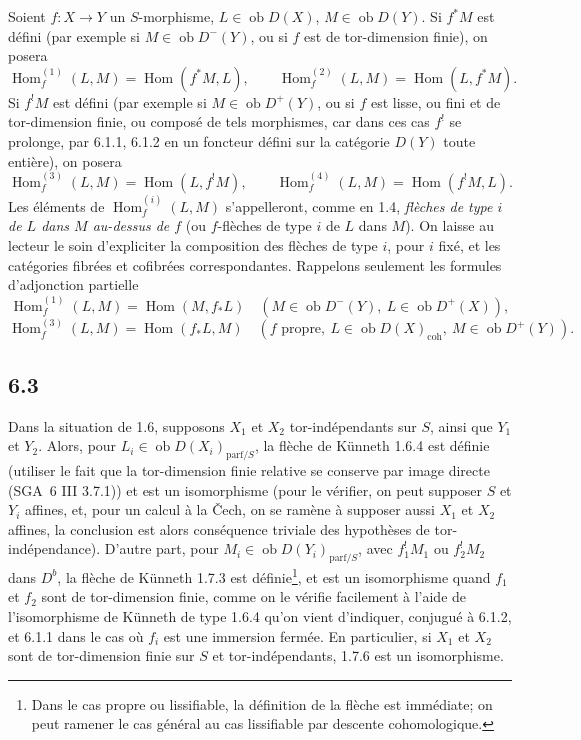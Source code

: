 \documentclass[11pt]{article}
\DeclareMathOperator{\Hom}{Hom}
\providecommand{\Hom}{\operatorname{Hom}}
\begin{document}
Soient $f:X\to Y$ un $S$-morphisme, $L\in\operatorname{ob}D(X)$, $M\in\operatorname{ob}D(Y)$. Si $f^*M$ est défini (par exemple si $M\in\operatorname{ob}D^-(Y)$, ou si $f$ est de tor-dimension finie), on posera
\[
\Hom_f^{(1)}(L,M)=\Hom(f^*M,L),\qquad
\Hom_f^{(2)}(L,M)=\Hom(L,f^*M).
\]
Si $f^!M$ est défini (par exemple si $M\in\operatorname{ob}D^+(Y)$, ou si $f$ est lisse, ou fini et de tor-dimension finie, ou composé de tels morphismes, car dans ces cas $f^!$ se prolonge, par 6.1.1, 6.1.2 en un foncteur défini sur la catégorie $D(Y)$ toute entière), on posera
\[
\Hom_f^{(3)}(L,M)=\Hom(L,f^!M),\qquad
\Hom_f^{(4)}(L,M)=\Hom(f^!M,L).
\]
Les éléments de $\Hom_f^{(i)}(L,M)$ s'appelleront, comme en 1.4, \emph{flèches de type $i$ de $L$ dans $M$ au-dessus de $f$} (ou $f$-flèches de type $i$ de $L$ dans $M$). On laisse au lecteur le soin d'expliciter la composition des flèches de type $i$, pour $i$ fixé, et les catégories fibrées et cofibrées correspondantes. Rappelons seulement les formules d'adjonction partielle
\[
\Hom_f^{(1)}(L,M)=\Hom(M,f_*L)\quad(M\in\operatorname{ob}D^{-}(Y),\ L\in\operatorname{ob}D^+(X)),
\]
\[
\Hom_f^{(3)}(L,M)=\Hom(f_*L,M)\quad(f\text{ propre},\ L\in\operatorname{ob}D(X)_{\mathrm{coh}},\ M\in\operatorname{ob}D^+(Y)).
\]

\subsection*{6.3}
Dans la situation de 1.6, supposons $X_1$ et $X_2$ tor-indépendants sur $S$, ainsi que $Y_1$ et $Y_2$. Alors, pour $L_i\in\operatorname{ob}D(X_i)_{\mathrm{parf}/S}$, la flèche de Künneth 1.6.4 est définie (utiliser le fait que la tor-dimension finie relative se conserve par image directe (SGA~6 III 3.7.1)) et est un isomorphisme (pour le vérifier, on peut supposer $S$ et $Y_i$ affines, et, pour un calcul à la Čech, on se ramène à supposer aussi $X_1$ et $X_2$ affines, la conclusion est alors conséquence triviale des hypothèses de tor-indépendance). D'autre part, pour $M_i\in\operatorname{ob}D(Y_i)_{\mathrm{parf}/S}$, avec $f_1^!M_1$ ou $f_2^!M_2$ dans $D^b$, la flèche de Künneth 1.7.3 est définie\footnote{Dans le cas propre ou lissifiable, la définition de la flèche est immédiate; on peut ramener le cas général au cas lissifiable par descente cohomologique.}, et est un isomorphisme quand $f_1$ et $f_2$ sont de tor-dimension finie, comme on le vérifie facilement à l'aide de l'isomorphisme de Künneth de type 1.6.4 qu'on vient d'indiquer, conjugué à 6.1.2, et 6.1.1 dans le cas où $f_i$ est une immersion fermée. En particulier, si $X_1$ et $X_2$ sont de tor-dimension finie sur $S$ et tor-indépendants, 1.7.6 est un isomorphisme.
\end{document}

